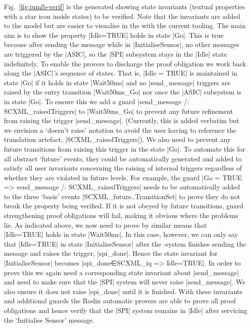 Fig.~\ref{fig:iumlb-verif} is the generated \iUMLB showing state invariants (textual properties with a star icon inside states) to be verified. Note that the invariants are added to the \SCXML model but are easier to visualise in the \iUMLB with the current tooling.
The main aim is to show the property |Idle=TRUE| holds in state |Go|. 
This is true because after sending the message while in |InitialiseSensor|, no other messages are triggered by the |ASIC|, so the |SPI| subsystem stays in the |Idle| state indefinitely. 
To enable the provers to discharge the proof obligation we work back along the |ASIC|'s sequence of states. 
That is, |Idle = TRUE| is maintained in state |Go| if it holds in state |Wait50ms| and no |send_message| triggers are raised by the entry transition |Wait50ms_Go| nor once the |ASIC| subsystem is in state |Go|. 
To ensure this we add a guard |send_message /: SCXML_raisedTriggers| to |Wait50ms_Go| to prevent any future refinement from raising the trigger |send_message|.
(Currently, this is added verbatim but we envision a `doesn't raise' notation to avoid the user having to reference the translation artefact, |SCXML_raisedTriggers|).
We also need to prevent any future transitions from raising this trigger in the state |Go|.
To automate this for all abstract `future' events, they could be automatically generated and added to satisfy all user invariants concerning the raising of internal triggers regardless of whether they are violated in future levels. 
For example, the guard  |Go = TRUE => send_message /: SCXML_raisedTriggers| needs to be automatically added to the three `basis' events |SCXML_future..TransitionSet| to prove they do not break the property being verified. 
If it is not obeyed by future transitions, guard strengthening proof obligations will fail, making it obvious where the problems lie.
As indicated above, we now need to prove by similar means that |Idle=TRUE| holds in state |Wait50ms|. 
In this case, however, we can only say that |Idle=TRUE| in state |InitialiseSensor| after the \SPI-system finishes sending the message and raises the trigger, |spi_done|. 
Hence the state invariant for |InitialiseSensor| becomes |spi_done∈SCXML_iq => Idle=TRUE|. 
In order to prove this we again need a corresponding state invariant about |send_message| and need to make sure that the |SPI| system will never raise |send_message|.
We also ensure it does not raise |spi_done| until it is finished. 
With these invariants and additional guards the Rodin automatic provers are able to prove all proof obligations and hence verify that the |SPI| system remains in |Idle| after servicing the `Initialise Sensor' message.


